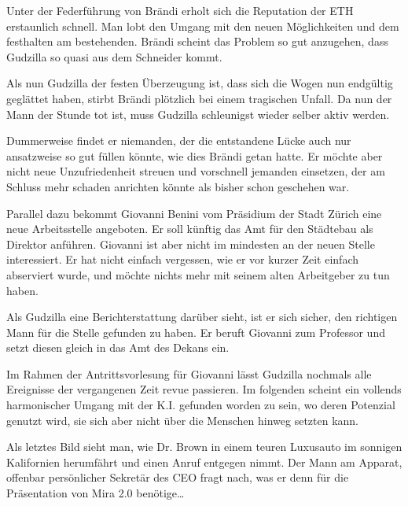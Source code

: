 \documentclass[11pt,a4paper,ngerman]{scrreprt}
\begin{document}
Unter der Federführung von Brändi erholt sich die Reputation der ETH
erstaunlich schnell. Man lobt den Umgang mit den neuen Möglichkeiten und dem
festhalten am bestehenden. Brändi scheint das Problem so gut anzugehen, dass
Gudzilla so quasi aus dem Schneider kommt.

Als nun Gudzilla der festen Überzeugung ist, dass sich die Wogen nun
endgültig geglättet haben, stirbt Brändi plötzlich bei einem tragischen
Unfall. Da nun der Mann der Stunde tot ist, muss Gudzilla schleunigst wieder
selber aktiv werden.

Dummerweise findet er niemanden, der die entstandene Lücke auch nur
ansatzweise so gut füllen könnte, wie dies Brändi getan hatte. Er möchte aber
nicht neue Unzufriedenheit streuen und vorschnell jemanden einsetzen, der am
Schluss mehr schaden anrichten könnte als bisher schon geschehen war.

Parallel dazu bekommt Giovanni Benini vom Präsidium der Stadt Zürich eine
neue Arbeitsstelle angeboten. Er soll künftig das Amt für den Städtebau als
Direktor anführen. Giovanni ist aber nicht im mindesten an der neuen Stelle
interessiert. Er hat nicht einfach vergessen, wie er vor kurzer Zeit einfach
abserviert wurde, und möchte nichts mehr mit seinem alten Arbeitgeber zu tun
haben.

Als Gudzilla eine Berichterstattung darüber sieht, ist er sich sicher, den
richtigen Mann für die Stelle gefunden zu haben. Er beruft Giovanni zum
Professor und setzt diesen gleich in das Amt des Dekans ein.

Im Rahmen der Antrittsvorlesung für Giovanni lässt Gudzilla nochmals alle
Ereignisse der vergangenen Zeit revue passieren. Im folgenden scheint ein
vollends harmonischer Umgang mit der K.I. gefunden worden zu sein, wo deren
Potenzial genutzt wird, sie sich aber nicht über die Menschen hinweg setzten
kann.

Als letztes Bild sieht man, wie Dr. Brown in einem teuren Luxusauto im
sonnigen Kalifornien herumfährt und einen Anruf entgegen nimmt. Der Mann am
Apparat, offenbar persönlicher Sekretär des CEO fragt nach, was er denn für
die Präsentation von Mira 2.0 benötige\ldots{}
\end{document}
